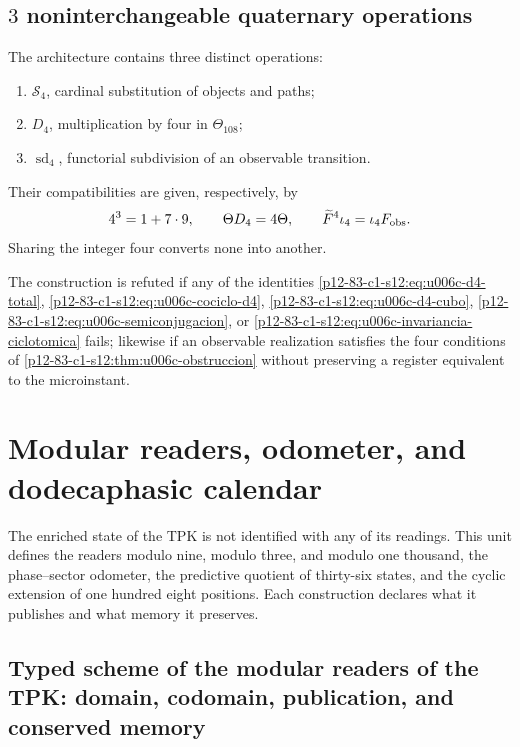\subsection{\(3\) noninterchangeable quaternary operations}

The architecture contains three distinct operations:
\begin{enumerate}
 \item \(\mathcal S_4\), cardinal substitution of objects and paths;
 \item \(D_4\), multiplication by four in
 \(\Theta_{108}\);
 \item \(\operatorname{sd}_4\), functorial subdivision of an observable
 transition.
\end{enumerate}
Their compatibilities are given, respectively, by
\[
 4^3=1+7\cdot9,\qquad
 \Theta D_4=4\Theta,\qquad
 \widetilde F^4\iota_4=\iota_4F_{\rm obs}.
\]
Sharing the integer four converts none into another.

\begin{criterion}
\label{p12-83-c1-s12:crit:u006c-refutacion}
The construction is refuted if any of the identities
\eqref{p12-83-c1-s12:eq:u006c-d4-total},
\eqref{p12-83-c1-s12:eq:u006c-cociclo-d4},
\eqref{p12-83-c1-s12:eq:u006c-d4-cubo},
\eqref{p12-83-c1-s12:eq:u006c-semiconjugacion}, or
\eqref{p12-83-c1-s12:eq:u006c-invariancia-ciclotomica} fails; likewise if an observable
realization satisfies the four conditions of
\cref{p12-83-c1-s12:thm:u006c-obstruccion} without preserving a register equivalent to the
microinstant.
\end{criterion}



\section{Modular readers, odometer, and dodecaphasic calendar}
\label{p12-83-c1-s13:chap:tpk-lectores-odometro-calendario}

The enriched state of the TPK is not identified with any of its readings.
This unit defines the readers modulo nine, modulo three, and modulo one thousand, the
phase--sector odometer, the predictive quotient of thirty-six states, and the
cyclic extension of one hundred eight positions. Each construction declares what it
publishes and what memory it preserves.

\subsection{Typed scheme of the modular readers of the TPK: domain, codomain, publication, and conserved memory}

